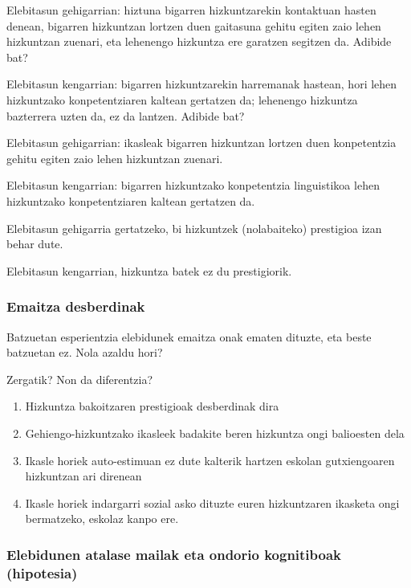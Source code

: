 \documentclass[
]{book}
\providecommand{\tightlist}{%
  \setlength{\itemsep}{0pt}\setlength{\parskip}{0pt}}
\begin{document}
Elebitasun gehigarrian: hiztuna bigarren hizkuntzarekin kontaktuan hasten denean, bigarren hizkuntzan lortzen duen gaitasuna gehitu egiten zaio lehen hizkuntzan zuenari, eta lehenengo hizkuntza ere garatzen segitzen da. Adibide bat?

Elebitasun kengarrian: bigarren hizkuntzarekin harremanak hastean, hori lehen hizkuntzako konpetentziaren kaltean gertatzen da; lehenengo hizkuntza bazterrera uzten da, ez da lantzen. Adibide bat?

Elebitasun gehigarrian: ikasleak bigarren hizkuntzan lortzen duen konpetentzia gehitu egiten zaio lehen hizkuntzan zuenari.

Elebitasun kengarrian: bigarren hizkuntzako konpetentzia linguistikoa lehen hizkuntzako konpetentziaren kaltean gertatzen da.

Elebitasun gehigarria gertatzeko, bi hizkuntzek (nolabaiteko) prestigioa izan behar dute.

Elebitasun kengarrian, hizkuntza batek ez du prestigiorik.

\hypertarget{emaitza-desberdinak}{%
\subsubsection{Emaitza desberdinak}\label{emaitza-desberdinak}}

Batzuetan esperientzia elebidunek emaitza onak ematen dituzte, eta beste batzuetan ez. Nola azaldu hori?

Zergatik? Non da diferentzia?

\begin{enumerate}
\def\labelenumi{\arabic{enumi}.}
\tightlist
\item
  Hizkuntza bakoitzaren prestigioak desberdinak dira
\item
  Gehiengo-hizkuntzako ikasleek badakite beren hizkuntza ongi balioesten dela
\item
  Ikasle horiek auto-estimuan ez dute kalterik hartzen eskolan gutxiengoaren hizkuntzan ari direnean
\item
  Ikasle horiek indargarri sozial asko dituzte euren hizkuntzaren ikasketa ongi bermatzeko, eskolaz kanpo ere.
\end{enumerate}

\hypertarget{elebidunen-atalase-mailak-eta-ondorio-kognitiboak-hipotesia}{%
\subsubsection{Elebidunen atalase mailak eta ondorio kognitiboak (hipotesia)}\label{elebidunen-atalase-mailak-eta-ondorio-kognitiboak-hipotesia}}
\end{document}
